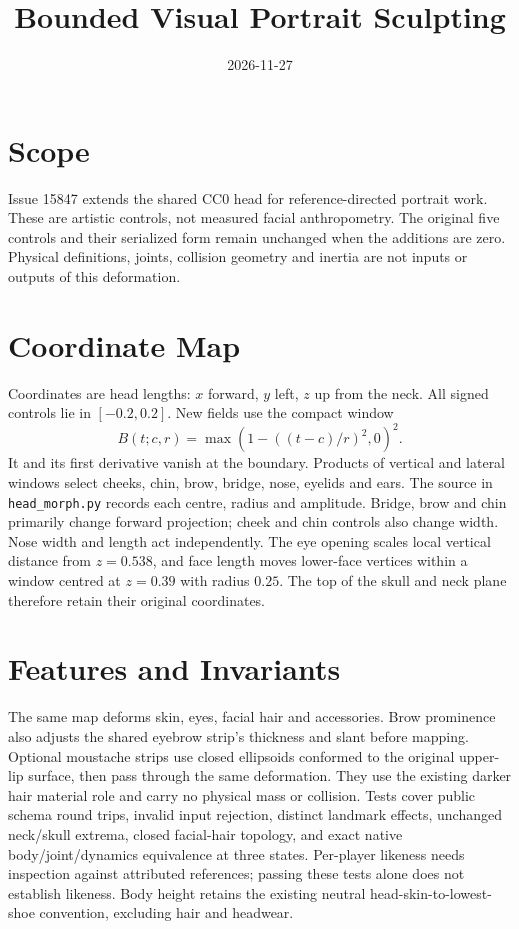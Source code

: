 \documentclass{article}
\title{Bounded Visual Portrait Sculpting}
\date{2026-11-27}
\begin{document}
\maketitle
\section{Scope}
Issue 15847 extends the shared CC0 head for reference-directed portrait work.
These are artistic controls, not measured facial anthropometry. The original
five controls and their serialized form remain unchanged when the additions
are zero. Physical definitions, joints, collision geometry and inertia are
not inputs or outputs of this deformation.
\section{Coordinate Map}
Coordinates are head lengths: $x$ forward, $y$ left, $z$ up from the neck.
All signed controls lie in $[-0.2,0.2]$. New fields use the compact window
\[B(t;c,r)=\max(1-((t-c)/r)^2,0)^2.\]
It and its first derivative vanish at the boundary. Products of vertical and
lateral windows select cheeks, chin, brow, bridge, nose, eyelids and ears.
The source in \texttt{head\_morph.py} records each centre, radius and amplitude.
Bridge, brow and chin primarily change forward projection; cheek and chin
controls also change width. Nose width and length act independently. The eye
opening scales local vertical distance from $z=0.538$, and face length moves
lower-face vertices within a window centred at $z=0.39$ with radius $0.25$.
The top of the skull and neck plane therefore retain their original coordinates.
\section{Features and Invariants}
The same map deforms skin, eyes, facial hair and accessories. Brow prominence
also adjusts the shared eyebrow strip's thickness and slant before mapping.
Optional moustache strips use closed ellipsoids conformed to the original
upper-lip surface, then pass through the same deformation. They use the
existing darker hair material role and carry no physical mass or collision.
Tests cover public schema round trips, invalid input rejection, distinct
landmark effects, unchanged neck/skull extrema, closed facial-hair topology,
and exact native body/joint/dynamics equivalence at three states. Per-player
likeness needs inspection against attributed references; passing these tests
alone does not establish likeness. Body height retains the existing neutral
head-skin-to-lowest-shoe convention, excluding hair and headwear.
\end{document}
